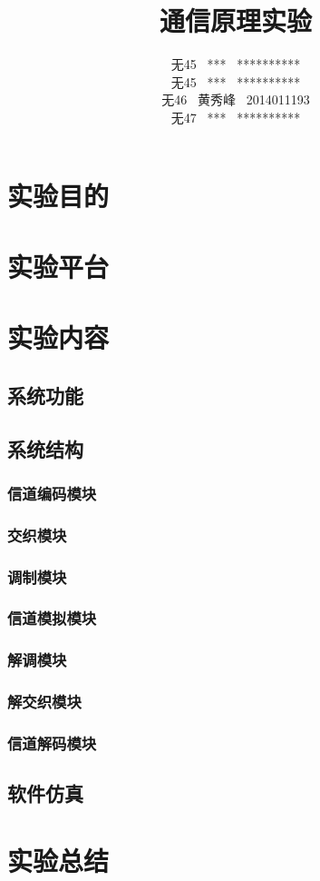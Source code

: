 \documentclass[UTF8]{ctexart}
\date{}
\title{\textbf{通信原理实验}}
\author{无45 \ *** \ **********\\
        无45 \ *** \ **********\\
        无46 \ 黄秀峰 \ 2014011193\\
        无47 \ *** \ **********}
\begin{document}
\maketitle

\section{实验目的}

\section{实验平台}

\section{实验内容}

\subsection{系统功能}

\subsection{系统结构}

\subsubsection{信道编码模块}


\subsubsection{交织模块}

\subsubsection{调制模块}

\subsubsection{信道模拟模块}

\subsubsection{解调模块}

\subsubsection{解交织模块}

\subsubsection{信道解码模块}

\subsection{软件仿真}

\section{实验总结}
\end{document}
